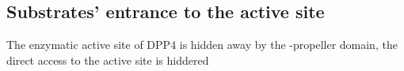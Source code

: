 \subsection{Substrates' entrance to the active site}

The enzymatic active site of DPP4 is hidden away by the \beta-propeller domain, the direct access to the active site is hiddered